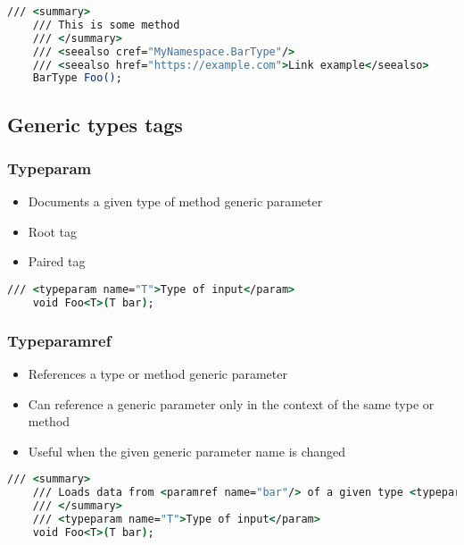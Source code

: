 \begin{lstlisting}[language=csh]
    /// <summary>
    /// This is some method
    /// </summary>
    /// <seealso cref="MyNamespace.BarType"/>
    /// <seealso href="https://example.com">Link example</seealso>
    BarType Foo();
\end{lstlisting}

\subsection{Generic types tags}

\subsubsection*{Typeparam}
\begin{itemize}
    \item Documents a given type of method generic parameter
    \item Root tag
    \item Paired tag
\end{itemize}

\begin{lstlisting}[language=csh]
    /// <typeparam name="T">Type of input</param>
    void Foo<T>(T bar);
\end{lstlisting}

\subsubsection*{Typeparamref}
\begin{itemize}
    \item References a type or method generic parameter
    \item Can reference a generic parameter only in the context of the same type or method
    \item Useful when the given generic parameter name is changed
\end{itemize}

\begin{lstlisting}[language=csh]
    /// <summary>
    /// Loads data from <paramref name="bar"/> of a given type <typeparamref name="T"/>
    /// </summary>
    /// <typeparam name="T">Type of input</param>
    void Foo<T>(T bar);
\end{lstlisting}